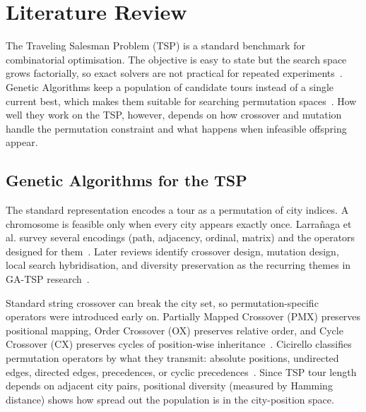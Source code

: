 \chapter{Literature Review}
\label{SecLiteratureReview}

The Traveling Salesman Problem (TSP) is a standard benchmark for
combinatorial optimisation. The objective is easy to state but the search space
grows factorially, so exact solvers are not practical for repeated
experiments~\cite{applegate2006traveling,reinelt1991tsplib}. Genetic
Algorithms keep a population of candidate tours instead of a single
current best, which makes them suitable for searching permutation
spaces~\cite{holland1975adaptation,goldberg1989genetic}. How well they work
on the TSP, however, depends on how crossover and mutation handle the
permutation constraint and what happens when infeasible offspring appear.

\section{Genetic Algorithms for the TSP}
\label{Lit:GAforTSP}

The standard representation encodes a tour as a permutation of city
indices. A chromosome is feasible only when every city appears exactly
once. Larra{\~n}aga et al. survey several encodings (path, adjacency,
ordinal, matrix) and the operators designed for
them~\cite{larranaga1999genetic}. Later reviews identify crossover design,
mutation design, local search hybridisation, and diversity preservation as
the recurring themes in GA-TSP
research~\cite{scholz2019historicalreview,cicirello2023permutationoperators}.

Standard string crossover can break the city set, so
permutation-specific operators were introduced early on. Partially Mapped
Crossover (PMX) preserves positional mapping, Order Crossover (OX) preserves
relative order, and Cycle Crossover (CX) preserves cycles of position-wise
inheritance~\cite{goldberg1985alleles,davis1985applying,oliver1987study}.
Cicirello classifies permutation operators by what they transmit: absolute
positions, undirected edges, directed edges, precedences, or cyclic
precedences~\cite{cicirello2023permutationoperators}. Since TSP tour length
depends on adjacent city pairs, positional diversity (measured by Hamming
distance) shows how spread out the population is in the city-position
space.

